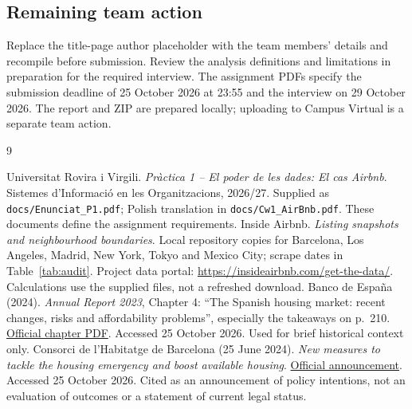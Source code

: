 \documentclass[11pt,a4paper]{article}
\begin{document}
\subsection{Remaining team action}
Replace the title-page author placeholder with the team members' details and recompile before submission. Review the analysis definitions and limitations in preparation for the required interview. The assignment PDFs specify the submission deadline of 25 October 2026 at 23:55 and the interview on 29 October 2026. The report and ZIP are prepared locally; uploading to Campus Virtual is a separate team action.

\clearpage
\begin{thebibliography}{9}
 Universitat Rovira i Virgili. \emph{Pr\`actica 1 -- El poder de les dades: El cas Airbnb}. Sistemes d'Informaci\'o en les Organitzacions, 2026/27. Supplied as \texttt{docs/Enunciat\_P1.pdf}; Polish translation in \texttt{docs/Cw1\_AirBnb.pdf}. These documents define the assignment requirements.
 Inside Airbnb. \emph{Listing snapshots and neighbourhood boundaries}. Local repository copies for Barcelona, Los Angeles, Madrid, New York, Tokyo and Mexico City; scrape dates in Table~\ref{tab:audit}. Project data portal: \url{https://insideairbnb.com/get-the-data/}. Calculations use the supplied files, not a refreshed download.
 Banco de Espa\~na (2024). \emph{Annual Report 2023}, Chapter 4: ``The Spanish housing market: recent changes, risks and affordability problems'', especially the takeaways on p.~210. \href{https://www.bde.es/f/webbe/SES/Secciones/Publicaciones/PublicacionesAnuales/InformesAnuales/23/Files/InfAnual_2023_Cap4_En.pdf}{Official chapter PDF}. Accessed 25 October 2026. Used for brief historical context only.
 Consorci de l'Habitatge de Barcelona (25 June 2024). \emph{New measures to tackle the housing emergency and boost available housing}. \href{https://www.consorcihabitatge.barcelona/en/noticies/new-measures-to-tackle-the-housing-emergency-and-boost-available-housing-1414006}{Official announcement}. Accessed 25 October 2026. Cited as an announcement of policy intentions, not an evaluation of outcomes or a statement of current legal status.
\end{thebibliography}
\end{document}
